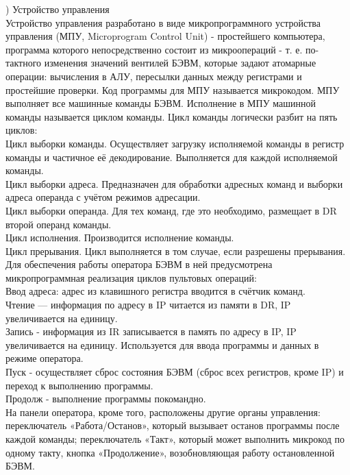 ) Устройство управления \\
Устройство управления разработано в виде микропрограммного устройства управления (МПУ, Microprogram Control Unit) - простейшего компьютера, программа которого непосредственно состоит из микроопераций - т. е. по-тактного изменения значений вентилей БЭВМ, которые задают атомарные операции: вычисления в АЛУ, пересылки данных между регистрами и простейшие проверки. Код программы для МПУ называется микрокодом.
МПУ выполняет все машинные команды БЭВМ. Исполнение в МПУ машинной команды называется циклом команды. Цикл команды логически разбит на пять циклов: \\
Цикл выборки команды. Осуществляет загрузку исполняемой команды в регистр команды и частичное её декодирование. Выполняется для каждой исполняемой команды. \\
Цикл выборки адреса. Предназначен для обработки адресных команд и выборки адреса операнда с учётом режимов адресации. \\
Цикл выборки операнда. Для тех команд, где это необходимо, размещает в DR второй операнд команды. \\
Цикл исполнения. Производится исполнение команды. \\
Цикл прерывания. Цикл выполняется в том случае, если разрешены прерывания. \\
Для обеспечения работы оператора БЭВМ в ней предусмотрена микропрограммная реализация циклов пультовых операций: \\
Ввод адреса: адрес из клавишного регистра вводится в счётчик команд. \\
Чтение — информация по адресу в IP читается из памяти в DR, IP увеличивается на единицу. \\
Запись -  информация из IR записывается в память по адресу в IP, IP увеличивается на единицу. Используется для ввода программы и данных в режиме оператора. \\
Пуск - осуществляет сброс состояния БЭВМ (сброс всех регистров, кроме IP) и переход к выполнению программы. \\
Продолж - выполнение программы покомандно. \\
На панели оператора, кроме того, расположены другие органы управления: переключатель «Работа/Останов», который вызывает останов программы после каждой команды; переключатель «Такт», который может выполнить микрокод по одному такту, кнопка «Продолжение», возобновляющая работу остановленной БЭВМ. \\

